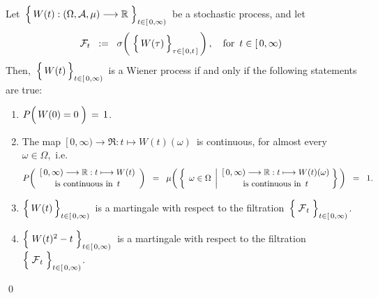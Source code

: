 \vskip 0.5cm
\begin{theorem}
\mbox{}
\vskip 0.2cm
\noindent
Let
\,$\left\{\,\overset{{\color{white}.}}{W}(t) : (\Omega,\mathcal{A},\mu) \longrightarrow \Re \;\right\}_{t \in[\,0,\infty)}$\,
be a stochastic process, and let
\begin{equation*}
\mathcal{F}_{t}
\;\; := \;\;
	\sigma\!\left(\;\left\{\,
		\overset{{\color{white}.}}{W}(\tau)
		\,\right\}_{\tau \in [\,0,t\,]}\,\right),
	\quad
	\textnormal{for \,$t \in [\,0,\infty)$}
\end{equation*}	
Then,
\,$\left\{\,\overset{{\color{white}.}}{W}(t)\,\right\}_{t \in[\,0,\infty)}$\,
is a Wiener process if and only if the following statements are true:
\begin{enumerate}
\item
	$P\!\left(\,W(0) \overset{{\color{white}-}}{=} 0 \;\right) \, = \, 1$.
\item
	The map
	\,$[\,0,\infty) \longrightarrow \Re : t \longmapsto W(t)(\omega)$\,
	is continuous, for almost every \,$\omega \in \Omega$,\, i.e.
	\begin{equation*}
	P\!\left(
		\begin{array}{c}
		[\,0,\infty) \longrightarrow \Re : t \longmapsto W(t)
		\\
		\overset{{\color{white}.}}{\textnormal{is continuous in \,$t$}}
		\end{array}
		\right)
	\;\; = \;\;
	\mu\!\left(\,\left\{\;\,
		\omega \in \Omega
		\;\left\vert
		\begin{array}{c}
		[\,0,\infty) \longrightarrow \Re : t \longmapsto W(t)(\omega)
		\\
		\overset{{\color{white}.}}{\textnormal{is continuous in \,$t$}}
		\end{array}
		\right.
		\!\!\right\}\,\right)
	\;\; = \;\; 1.
	\end{equation*}
\item
	$\left\{\,\overset{{\color{white}.}}{W}(t)\,\right\}_{t \in[\,0,\infty)}$\,
	is a martingale with respect to the filtration
	\,$\left\{\;\overset{{\color{white}.}}{\mathcal{F}}_{t}\;\right\}_{t\in[\,0,\infty)}$.
\item
	$\left\{\; \overset{{\color{white}.}}{W}(t)^{2} - t \;\right\}_{t \in[\,0,\infty)}$\,
	is a martingale with respect to the filtration
	\,$\left\{\;\overset{{\color{white}.}}{\mathcal{F}}_{t}\;\right\}_{t\in[\,0,\infty)}$.
\end{enumerate}
\end{theorem}
\proof
\qed

